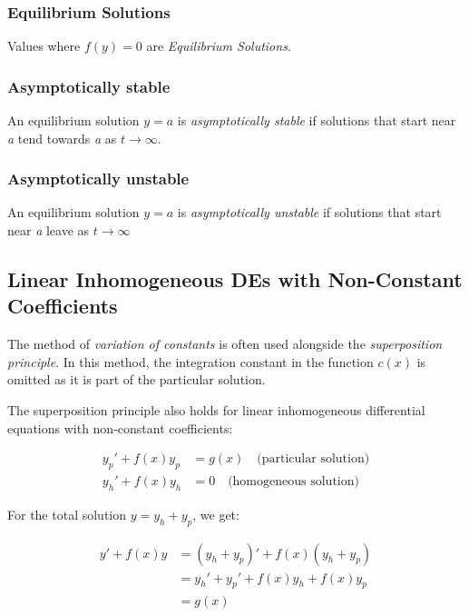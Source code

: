 \subsubsection{Equilibrium Solutions}

Values where \(f(y) = 0\) are \emph{Equilibrium Solutions}.

\subsubsection*{Asymptotically stable}

An equilibrium solution \(y = a\) is \emph{asymptotically stable} if solutions
that start near \emph{a} tend towards \emph{a} as \(t \to \infty\).

\subsubsection*{Asymptotically unstable}

An equilibrium solution \(y = a\) is \emph{asymptotically unstable} if solutions
that start near \emph{a} leave as \(t \to \infty\)

\subsection{Linear Inhomogeneous DEs with Non-Constant Coefficients}

The method of \emph{variation of constants} is often used alongside the \emph{superposition principle}. 
In this method, the integration constant in the function \( c(x) \) is omitted as it is part of the 
particular solution.
\vspace{\baselineskip}

The superposition principle also holds for linear inhomogeneous differential equations with 
non-constant coefficients:

\begin{align*}
    y_p' + f(x)y_p &= g(x) \quad \text{(particular solution)} \\
    y_h' + f(x)y_h &= 0 \quad \text{(homogeneous solution)}
\end{align*}

For the total solution \( y = y_h + y_p \), we get:

\begin{align*}
    y' + f(x)y 
    &= (y_h + y_p)' + f(x)(y_h + y_p) \\
    &= y_h' + y_p' + f(x)y_h + f(x)y_p \\
    &= g(x)
\end{align*}


